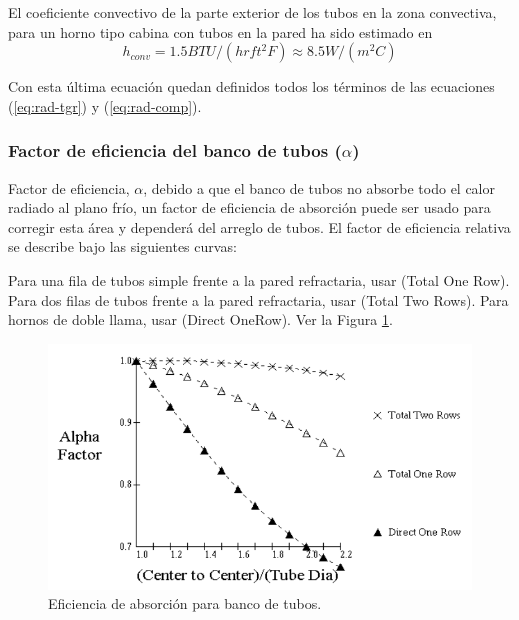 \par El coeficiente convectivo de la parte exterior de los tubos en la zona convectiva, para un horno tipo cabina con tubos en la pared ha sido estimado en
\begin{equation}
h_{conv} = 1.5  BTU/(hr ft^2 F) \approx 8.5 W/(m^2 C)
\end{equation}

Con esta última ecuación quedan definidos todos los términos de las ecuaciones (\ref{eq:rad-tgr}) y (\ref{eq:rad-comp}).

\subsubsection{Factor de eficiencia del banco de tubos ($\alpha$)}

Factor de eficiencia, $\alpha$, debido a que el banco de tubos no absorbe todo el calor radiado al plano frío, un factor de eficiencia de absorción puede ser usado para corregir esta área y dependerá del arreglo de tubos. El factor de eficiencia relativa se describe bajo las siguientes curvas:
\par Para una fila de tubos simple frente a la pared refractaria, usar (Total One Row). Para dos filas de tubos frente a la pared refractaria, usar (Total Two Rows). Para hornos de doble llama, usar (Direct OneRow). Ver la Figura \ref{fig:alpha}.

\begin{figure}[hbt]
\begin{center}
\includegraphics[scale=0.45]{images/alpha}
\caption[Eficiencia de absorción para banco de tubos]{Eficiencia de absorción para banco de tubos.}
\label{fig:alpha}
\end{center}
\end{figure}

